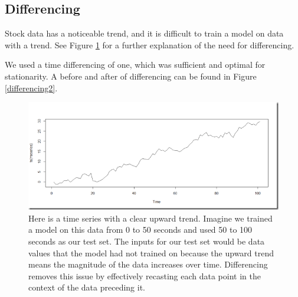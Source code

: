 \documentclass[12pt]{article}
\begin{document}
\subsection{Differencing}
Stock data has a noticeable trend, and it is difficult to train a model on data with a trend. See Figure \ref{differencing} for a further explanation of the need for differencing.

We used a time differencing of one, which was sufficient and optimal for stationarity. A before and after of differencing can be found in Figure \ref{differencing2}. 

\begin{figure}
	\centering
	\includegraphics[width=.75\linewidth]{difference.png}
	\caption{Here is a time series with a clear upward trend. Imagine we trained a model on this data from 0 to 50 seconds and used 50 to 100 seconds as our test set. The inputs for our test set would be data values that the model had not trained on because the upward trend means the magnitude of the data increases over time. Differencing removes this issue by effectively recasting each data point in the context of the data preceding it.}
	\label{differencing}
\end{figure}
\end{document}

